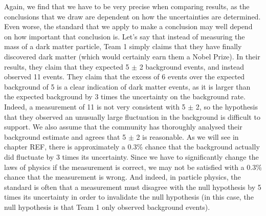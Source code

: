 Again, we find that we have to be very precise when comparing results, as the conclusions that we draw are dependent on how the uncertainties are determined. Even worse, the standard that we apply to make a conclusion may well depend on how important that conclusion is. Let's say that instead of measuring the mass of a dark matter particle, Team 1 simply claims that they have finally discovered dark matter (which would certainly earn them a Nobel Prize). In their results, they claim that they expected 5 $\pm$ 2 background events, and instead observed 11 events. They claim that the excess of 6 events over the expected background of 5 is a clear indication of dark matter events, as it is larger than the expected background by 3 times the uncertainty on the background rate. Indeed, a measurement of 11 is not very consistent with 5 $\pm$ 2, so the hypothesis that they observed an unusually large fluctuation in the background is difficult to support. We also assume that the community has thoroughly analysed their background estimate and agrees that 5 $\pm$ 2 is reasonable. As we will see in chapter REF, there is approximately a 0.3\% chance that the background actually did fluctuate by 3 times its uncertainty. Since we have to significantly change the laws of physics if the measurement is correct, we may not be satisfied with a 0.3\% chance that the measurement is wrong. And indeed, in particle physics, the standard is often that a measurement must disagree with the null hypothesis by 5 times its uncertainty in order to invalidate the null hypothesis (in this case, the null hypothesis is that Team 1 only observed background events).

